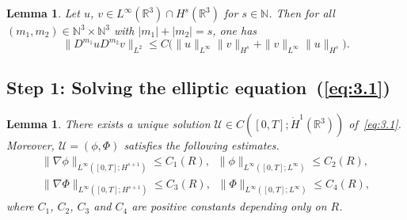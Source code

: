 \documentclass[10pt]{amsart}
\newtheorem{lemm}[theo]{Lemma}\newtheorem{prop}[theo]{Proposition}\newtheorem{coro}[theo]{Corollary}\newtheorem{conj}[theo]{Conjecture}
\theoremstyle{definition}\newtheorem{defi}[theo]{Definition}\newtheorem{rema}[theo]{Remark}\newtheorem{exam}[theo]{Example}\newtheorem{exem}[theo]{Example}\newtheorem{nota}[theo]{Notation}
\newcommand{\R}{\mathbb{R}}
\newcommand{\N}{\mathbb{N}}
\begin{document}
\begin{lemm}\label{alhinac}
Let $u$, $v \in L^\infty(\R^3)\cap H^s(\R^3)$ for $s \in \N$. Then for all $(m_1,m_2)\in \N^3\times \N^3$ with $|m_1|+|m_2|=s$, one has
\[
\| D^{m_1}u D^{m_2}v \|_{L^2}
\leq C\big(\|u \|_{L^\infty} \| v \|_{H^s} +\| v \|_{L^\infty} \| u \|_{H^s}\big).
\]
\end{lemm}

\subsection*{Step 1: Solving the elliptic equation~(\ref{eq:3.1})}

\begin{lemm}\label{elliptic1}
There exists a unique solution $\mathcal{U}\in C([0,T];\dot{H}^1(\R^3))$ of~\eqref{eq:3.1}. Moreover, $\mathcal{U}=(\phi,\Phi)$ satisfies the following estimates.
\begin{align}
\| \nabla\phi \|_{L^\infty([0,T];H^{s+1})} \leq C_1(R), \;\;
\| \phi \|_{L^\infty([0,T];L^\infty)} \leq C_2(R), \label{est1}
\\
\| \nabla\Phi \|_{L^\infty([0,T];H^{s+1})} \leq C_3(R), \;\;
\| \Phi \|_{L^\infty([0,T];L^\infty)} \leq C_4(R), \label{est2}
\end{align}
where $C_1$, $C_2$, $C_3$ and $C_4$ are positive constants depending only on $R$.
\end{lemm}
\end{document}
